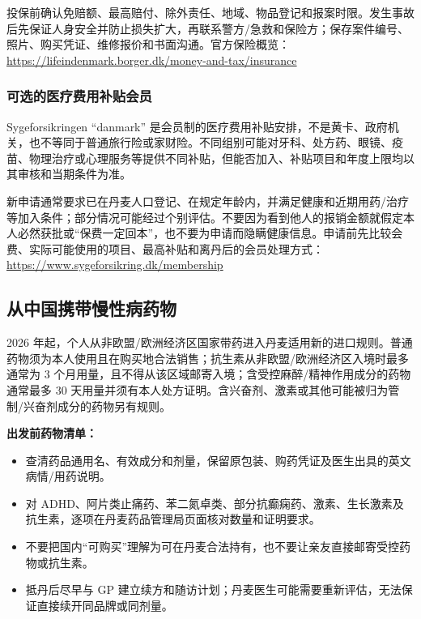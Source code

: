 投保前确认免赔额、最高赔付、除外责任、地域、物品登记和报案时限。发生事故后先保证人身安全并防止损失扩大，再联系警方/急救和保险方；保存案件编号、照片、购买凭证、维修报价和书面沟通。官方保险概览：\url{https://lifeindenmark.borger.dk/money-and-tax/insurance}

\subsubsection*{可选的医疗费用补贴会员}

Sygeforsikringen ``danmark'' 是会员制的医疗费用补贴安排，不是黄卡、政府机关，也不等同于普通旅行险或家财险。不同组别可能对牙科、处方药、眼镜、疫苗、物理治疗或心理服务等提供不同补贴，但能否加入、补贴项目和年度上限均以其审核和当期条件为准。

新申请通常要求已在丹麦人口登记、在规定年龄内，并满足健康和近期用药/治疗等加入条件；部分情况可能经过个别评估。不要因为看到他人的报销金额就假定本人必然获批或“保费一定回本”，也不要为申请而隐瞒健康信息。申请前先比较会费、实际可能使用的项目、最高补贴和离丹后的会员处理方式：\url{https://www.sygeforsikring.dk/membership}

\subsection{从中国携带慢性病药物}

2026 年起，个人从非欧盟/欧洲经济区国家带药进入丹麦适用新的进口规则。普通药物须为本人使用且在购买地合法销售；抗生素从非欧盟/欧洲经济区入境时最多通常为 3 个月用量，且不得从该区域邮寄入境；含受控麻醉/精神作用成分的药物通常最多 30 天用量并须有本人处方证明。含兴奋剂、激素或其他可能被归为管制/兴奋剂成分的药物另有规则。

\begin{grayleftbox}
\textbf{出发前药物清单：}
\begin{itemize}
  \item 查清药品通用名、有效成分和剂量，保留原包装、购药凭证及医生出具的英文病情/用药说明。
  \item 对 ADHD、阿片类止痛药、苯二氮卓类、部分抗癫痫药、激素、生长激素及抗生素，逐项在丹麦药品管理局页面核对数量和证明要求。
  \item 不要把国内“可购买”理解为可在丹麦合法持有，也不要让亲友直接邮寄受控药物或抗生素。
  \item 抵丹后尽早与 GP 建立续方和随访计划；丹麦医生可能需要重新评估，无法保证直接续开同品牌或同剂量。
\end{itemize}
\end{grayleftbox}

